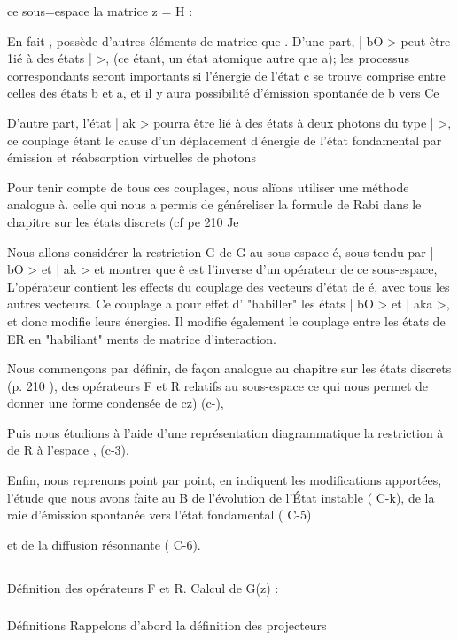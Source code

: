 ce sous=espace la matrice z = H :

En fait , possède d'autres éléments de matrice que
.
D'une part, | bO > peut être 1ié à des états |  >, (ce étant,
un état atomique autre que a); les processus correspondants seront importants
si l'énergie de l'état c se trouve comprise entre celles des états b et a, et
il y aura possibilité d'émission spontanée de b vers Ce

D'autre part, l'état | ak > pourra être lié à des états à deux
photons du type |  >, ce couplage étant le cause d'un déplacement
d'énergie de l'état fondamental par émission et réabsorption virtuelles de
photons

Pour tenir compte de tous ces couplages, nous alïons utiliser
une méthode analogue à. celle qui nous a permis de généreliser la formule de
Rabi dans le chapitre sur les états discrets (cf pe 210 Je

Nous allons considérer la restriction G de G au sous-espace é,
sous-tendu par | bO > et | ak > et montrer que ê est l'inverse d'un opérateur
de ce sous-espace,  L'opérateur  contient les effects du couplage
des vecteurs d'état de é, avec tous les autres vecteurs. Ce couplage a pour
effet d' "habiller" les états | bO > et | aka >, et donc modifie leurs énergies.
Il modifie également le couplage entre les états de ER en "habiliant" 
ments de matrice d'interaction.

Nous commençons par définir, de façon analogue au chapitre sur
les états discrets (p. 210 ), des opérateurs F et R relatifs au sous-espace 
ce qui nous permet de donner une forme condensée de cz) (c-),

Puis nous étudions à l'aide d'une représentation diagrammatique
la restriction à de R à l'espace , (c-3),

Enfin, nous reprenons point par point, en indiquent les modifications apportées, l'étude que nous avons faite au  B de l'évolution de l'État instable ( C-k), de la raie d'émission spontanée vers l'état fondamental ( C-5)

et de la diffusion résonnante ( C-6).


\subsection{} Définition des opérateurs F et R. Calcul de G(z) :%
\subsubsection{} Définitions Rappelons d'abord la définition des projecteurs%


